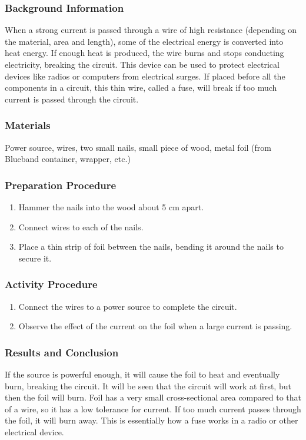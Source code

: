 \subsubsection*{Background Information}
When a strong current is passed through a wire of high resistance (depending on the material, area and length), some of the electrical energy is converted into heat energy.  If enough heat is produced, the wire burns and stops conducting electricity, breaking the circuit.  This device can be used to protect electrical devices like radios or computers from electrical surges.  If placed before all the components in a circuit, this thin wire, called a fuse, will break if too much current is passed through the circuit.

\subsubsection*{Materials}
Power source, wires, two small nails, small piece of wood, metal foil (from Blueband container, wrapper, etc.)

\subsubsection*{Preparation Procedure}
\begin{enumerate}
\item{Hammer the nails into the wood about 5 cm apart.}
\item{Connect wires to each of the nails.}
\item{Place a thin strip of foil between the nails, bending it around the nails to secure it.}
\end{enumerate}

\subsubsection*{Activity Procedure}
\begin{enumerate}
\item{Connect the wires to a power source to complete the circuit.}
\item{Observe the effect of the current on the foil when a large current is passing.}
\end{enumerate}

\subsubsection*{Results and Conclusion}
If the source is powerful enough, it will cause the foil to heat and eventually burn, breaking the circuit.  It will be seen that the circuit will work at first, but then the foil will burn.  Foil has a very small cross-sectional area compared to that of a wire, so it has a low tolerance for current. If too much current passes through the foil, it will burn away. This is essentially how a fuse works in a radio or other electrical device.

